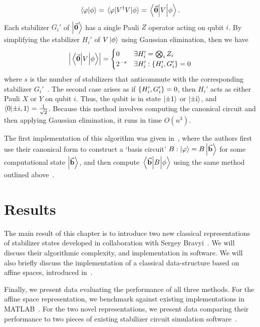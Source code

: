 \[
\braket{\varphi}{\phi} = \matrixel{\varphi}{V^{\dagger}V}{\phi} = \matrixel{\va{0}}{V}{\phi}.
\]
Each stabilizer $G_{i}'$ of $\ket{\va{0}}$ has a single Pauli $Z$ operator acting on qubit $i$. By simplifying the stabilizer $H_{i}'$ of $V\ket{\phi}$ using Gaussian elimination, then we have
\begin{equation}
\left\vert \matrixel{\va{0}}{V}{\phi}\right\vert = \begin{cases}
 0 & \exists H_{i}' = \bigotimes_{i}Z_{i}\\
 2^{-s} & \exists H_{i}' : \acomm{H_{i}'}{G_{i}'} = 0
\end{cases}
\end{equation}
where $s$ is the number of stabilizers that anticommute with the corresponding stabilizer $G_{i}'$~\cite{Aaronson2004}. The second case arises as if $\acomm{H_{i}'}{G_{i}'} = 0$, then $H_{i}'$ acts as either Pauli $X$ or $Y$ on qubit $i$. Thus, the qubit is in state $\ket{\pm 1}$ or $\ket{\pm\mathrm{i}}$, and $\braket{0}{\pm i,1}=\frac{1}{\sqrt{2}}$. Because this method involves computing the canonical circuit and then applying Gaussian elimination, it runs in time $O(n^{3})$.\par
The first implementation of this algorithm was given in~\cite{Garcia2012}, where the authors first use their canonical form to construct a `basis circuit' $B : \ket{\varphi}=B\ket{\va{b}}$ for some computational state $\ket{\va{b}}$, and then compute $\matrixel{\va{b}}{B}{\phi}$ using the same method outlined above~\cite{Garcia2012}.
\section{Results}
The main result of this chapter is to introduce two new classical representations of stabilizer states developed in collaboration with Sergey Bravyi~\cite{Bravyi2018}. We will discuss their algorithmic complexity, and implementation in software. We will also briefly discuss the implementation of a classical data-structure based on affine spaces, introduced in~\cite{Bravyi2016}.\par
Finally, we  present data evaluating the performance of all three methods. For the affine space representation, we benchmark against existing implementations in MATLAB~\cite{Bravyi2016}. For the two novel representations, we present data comparing their performance to two pieces of existing stabilizer circuit simulation software~\cite{Aaronson2004,Anders2006}.
